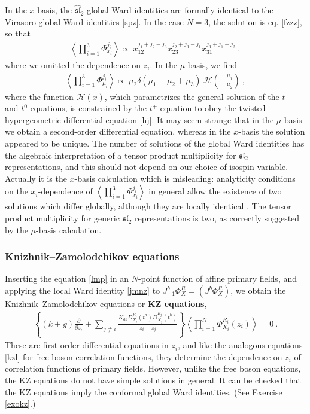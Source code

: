 \documentclass[12pt, a4paper, notitlepage, twoside]{report}
\numberwithin{equation}{section}
\theoremstyle{break}
\begin{document}
In the $x$-basis, the $\widehat{\mathfrak{sl}}_2$ global Ward identities are formally identical to the Virasoro global Ward identities \eqref{spz}. In the case $N=3$, the solution is eq. \eqref{fzzz}, so that 
\begin{align}
 \left\langle \prod_{i=1}^3 \Phi^{j_i}_{x_i} \right\rangle \propto\ x_{12}^{j_1+j_2-j_3} x_{23}^{j_2+j_3-j_1} x_{31}^{j_3+j_1-j_2}\ ,
\label{xxx}
\end{align}
where we omitted the dependence on $z_i$.
In the $\mu$-basis, we find 
\begin{align}
 \left\langle \prod_{i=1}^3\Phi^{j_i}_{\mu_i}\right\rangle \propto\ \mu_2\delta(\mu_1+\mu_2+\mu_3)\ \mathcal{H}\left(-\frac{\mu_1}{\mu_2}\right)\ ,
\label{pmf}
\end{align}
where the function $\mathcal{H}(x)$, which parametrizes the general solution of the $t^-$ and $t^0$ equations, is constrained by the $t^+$ equation to obey the twisted hypergeometric differential equation \eqref{hj}.
It may seem strange that in the $\mu$-basis we obtain a second-order differential equation, whereas in the $x$-basis the solution appeared to be unique.
The number of solutions of the global Ward identities has the algebraic interpretation of a tensor product multiplicity for $\mathfrak{sl}_2$ representations, and this should not depend on our choice of isospin variable.
Actually it is the $x$-basis calculation which is misleading: analyticity conditions on the $x_i$-dependence of $\left\langle \prod_{i=1}^3 \Phi^{j_i}_{x_i} \right\rangle$ in general allow the existence of two solutions which differ globally, although they are locally identical \cite{rib09}.
The tensor product multiplicity for generic $\mathfrak{sl}_2$ representations is two, as correctly suggested by the $\mu$-basis calculation. 

\subsubsection{Knizhnik--Zamolodchikov equations}

Inserting the equation \eqref{lmp} in an $N$-point function of affine primary fields, and applying the local Ward identity \eqref{jmnz} to $J^b_{-1}\Phi^R_X = (J^b\Phi^R_X)$, we obtain the Knizhnik--Zamolodchikov equations or \textbf{\boldmath KZ equations},
\begin{align}
 \boxed{\left\{(k+g){\frac{\partial}{\partial z_i}} + \sum_{j\neq i} \frac{K_{ab}D_{X_i}^{R_i}(t^a)D_{X_j}^{R_j}(t^b)}{z_i-z_j}\right\}\left\langle \prod_{i=1}^N \Phi^{R_i}_{X_i}(z_i)\right\rangle  = 0}\ .
\label{kz} 
\end{align}
These are first-order differential equations in $z_i$, and like the analogous equations \eqref{kzl} for free boson correlation functions, they determine the dependence on $z_i$ of correlation functions of primary fields.
However, unlike the free boson equations, the KZ equations do not have simple solutions in general. 
It can be checked that the KZ equations imply the conformal global Ward identities. (See Exercise \ref{exokz}.)
\end{document}
